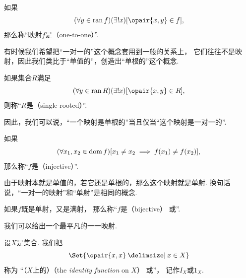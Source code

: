 如果\begin{equation*}
	(\forall y \in \ran f)
	(\exists! x)
	[\opair{x,y} \in f],
\end{equation*}
那么称“映射\(f\)是（one-to-one）”.

有时候我们希望把“一对一的”这个概念套用到一般的关系上，
它们往往不是映射，因此我们类比于“单值的”，创造出“单根的”这个概念.
\begin{definition}
如果集合\(R\)满足\begin{equation*}
	(\forall y \in \ran R)
	(\exists! x)
	[\opair{x,y} \in R],
\end{equation*}
则称“\(R\)是（single-rooted）”.
\end{definition}

因此，我们可以说，“一个映射是单根的”当且仅当“这个映射是一对一的”.

如果\begin{equation*}
	(\forall x_1, x_2 \in \operatorname{dom} f)
	[x_1 \neq x_2 \implies f(x_1) \neq f(x_2)],
\end{equation*}
那么称“\(f\)是（injective）”.

由于映射本就是单值的，若它还是单根的，那么这个映射就是单射.
换句话说，“一对一的映射”和“单射”是相同的概念.

如果\(f\)既是单射，又是满射，
那么称“\(f\)是（bijective）
或”.

我们可以给出一个最平凡的一一映射.
\begin{definition}
设\(X\)是集合.
我们把\begin{equation*}
	\Set{ \opair{x,x} \given x \in X }
\end{equation*}称为
“（\(X\)上的）（the \emph{identity function} on \(X\)）
或”，
记作\(I_X\)或\(1_X\).
\end{definition}

